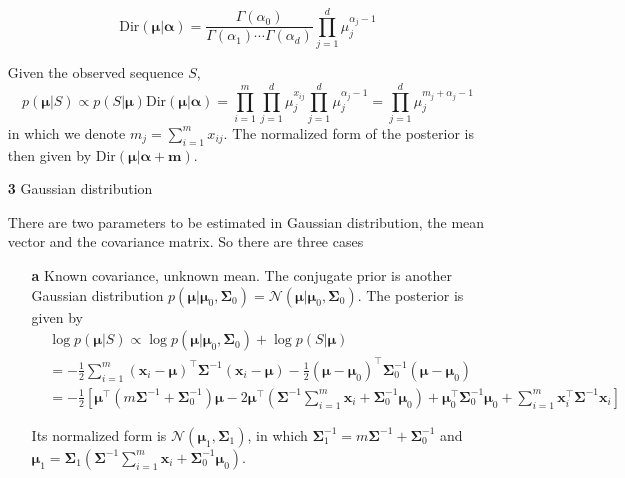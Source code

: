 \documentclass{article}
\begin{document}
\begin{itemize}
	\begin{equation*}
	\mathrm{Dir} (\bm{\mu}|\bm{\alpha}) = \frac{\Gamma(\alpha_0)}{\Gamma(\alpha_1)\cdots\Gamma(\alpha_d)}  \prod_{j=1}^d \mu_j^{\alpha_j-1}
	\end{equation*}
	
	Given the observed sequence $S$, 
	\begin{equation*}
	p(\bm{\mu}|S) \propto p(S|\bm{\mu}) \mathrm{Dir} (\bm{\mu}|\bm{\alpha}) =\prod_{i=1}^m \prod_{j=1}^d \mu_j^{x_{ij}} \prod_{j=1}^d \mu_j^{\alpha_j-1} =  \prod_{j=1}^d \mu_j^{m_j+\alpha_j-1}
	\end{equation*}
in which we denote $m_j=\sum_{i=1}^m x_{ij}$. The normalized form of the posterior is then given by $\mathrm{Dir}(\bm{\mu}|\bm{\alpha}+\bm{m})$.
	
	\item [\textbf{3}] Gaussian distribution

	There are two parameters to be estimated in Gaussian distribution, the mean vector and the covariance matrix. So there are three cases
	
	\begin{itemize}
	\item [\textbf{a}] Known covariance, unknown mean.
	The conjugate prior is another Gaussian distribution $p(\bm{\mu}|\bm{\mu}_0, \bm{\Sigma}_0)=\mathcal{N}(\bm{\mu}|\bm{\mu}_0, \bm{\Sigma}_0)$. The posterior is given by
	\begin{equation*}
	\begin{split}
	& \log p(\bm{\mu}|S) \propto \log p(\bm{\mu}|\bm{\mu}_0, \bm{\Sigma}_0) + \log p(S|\bm{\mu}) \\
	&= -\frac{1}{2} \sum_{i=1}^m  (\bm{x}_i-\bm{\mu})^\top \bm{\Sigma}^{-1}  (\bm{x}_i-\bm{\mu}) -\frac{1}{2}(\bm{\mu}-\bm{\mu}_0)^\top \bm{\Sigma}_0^{-1} (\bm{\mu}-\bm{\mu}_0) \\
	&= -\frac{1}{2} \left[ \bm{\mu}^\top (m\bm{\Sigma}^{-1} + \bm{\Sigma}_0^{-1}) \bm{\mu} - 2 \bm{\mu}^\top \left(\bm{\Sigma}^{-1} \sum_{i=1}^m \bm{x}_i + \bm{\Sigma}_0^{-1} \bm{\mu}_0\right) + \bm{\mu}_0^\top \bm{\Sigma}_0^{-1} \bm{\mu}_0 + \sum_{i=1}^m \bm{x}_i^\top \bm{\Sigma}^{-1} \bm{x}_i\right]
	\end{split}
	\end{equation*}
	
	Its normalized form is $\mathcal{N}(\bm{\mu}_1,\bm{\Sigma}_1)$, in which $\bm{\Sigma}_1^{-1}=m\bm{\Sigma}^{-1} + \bm{\Sigma}_0^{-1}$ and $\bm{\mu}_1=\bm{\Sigma}_1(\bm{\Sigma}^{-1} \sum_{i=1}^m \bm{x}_i + \bm{\Sigma}_0^{-1} \bm{\mu}_0)$.


\end{itemize}
\end{itemize}
\end{document}
